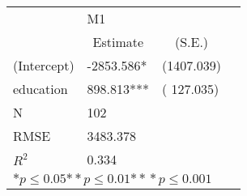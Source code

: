 \begin{tabular}{@{}l*{3}{l}@{}}
\hline
  &\multicolumn{2}{l}{M1  }\tabularnewline
 &\multicolumn{1}{c}{Estimate}&\multicolumn{1}{c}{(S.E.)}\tabularnewline
 \hline
 \hline
  (Intercept) & -2853.586* & (1407.039) \tabularnewline
  education & 898.813*** & ( 127.035) \tabularnewline
 \hline
 N&\multicolumn{1}{l}{102}  & \tabularnewline
 RMSE&3483.378\tabularnewline
 $R^2$&0.334\tabularnewline
 \hline
\hline
 
 \multicolumn{3}{l}{  ${*  p}\le 0.05$${*\!\!*  p}\le 0.01$${*\!\!*\!\!*  p}\le 0.001$}\tabularnewline
 \end{tabular}